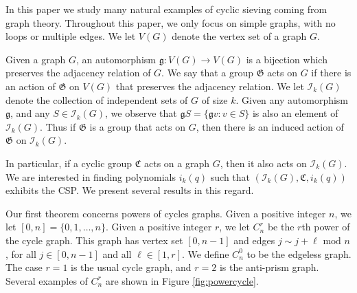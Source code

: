\documentclass[12pt]{article}
\theoremstyle{definition}
\begin{document}
 In this paper we study many natural examples of cyclic sieving coming from graph theory. Throughout this paper, we only focus on simple graphs, with no loops or multiple edges. We let $V(G)$ denote the vertex set of a graph $G$.
 
Given a graph $G$, an automorphism $\mathfrak{g}: V(G) \to V(G)$ is a bijection which preserves the adjacency relation of $G$. We say that a group $\mathfrak{G}$ acts on $G$ if there is an action of $\mathfrak{G}$ on $V(G)$ that preserves the adjacency relation. We let $\mathcal{I}_k(G)$ denote the collection of independent sets of $G$ of size $k$. Given any automorphism $\mathfrak{g}$, and any $S \in \mathcal{I}_k(G)$, we observe that $\mathfrak{g}S = \{\mathfrak{g}v: v \in S \}$ is also an element of $\mathcal{I}_k(G).$ Thus if $\mathfrak{G}$ is a group that acts on $G$, then there is an induced action of $\mathfrak{G}$ on $\mathcal{I}_k(G).$ 

In particular, if a cyclic group $\mathfrak{C}$ acts on a graph $G$, then it also acts on $\mathcal{I}_k(G).$ We are interested in finding polynomials $i_k(q)$ such that $(\mathcal{I}_k(G), \mathfrak{C}, i_k(q))$ exhibits the CSP. We present several results in this regard.

Our first theorem concerns powers of cycles graphs. Given a positive integer $n$, we let $[0,n] = \{0,1,\ldots, n\}$. Given a positive integer $r$, we let $C_n^r$ be the $r$th power of the cycle graph. This graph has vertex set $[0,n-1]$ and edges $j \sim j+\ell \mbox{ mod } n$, for all $j \in [0,n-1]$ and all $\ell \in [1,r].$ We define $C_n^0$ to be the edgeless graph. The case $r=1$ is the usual cycle graph, and $r=2$ is the anti-prism graph. Several examples of $C_n^r$ are shown in Figure \ref{fig:powercycle}.
\end{document}
